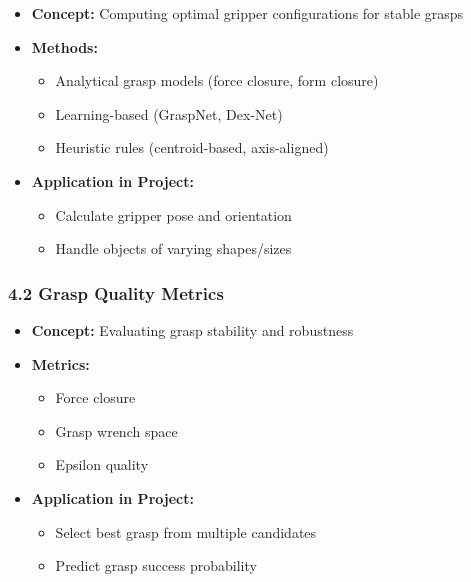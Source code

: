 \documentclass[
]{article}
\providecommand{\tightlist}{%
  \setlength{\itemsep}{0pt}\setlength{\parskip}{0pt}}
\begin{document}
\begin{itemize}
\tightlist
\item
  \textbf{Concept:} Computing optimal gripper configurations for stable
  grasps
\item
  \textbf{Methods:}

  \begin{itemize}
  \tightlist
  \item
    Analytical grasp models (force closure, form closure)
  \item
    Learning-based (GraspNet, Dex-Net)
  \item
    Heuristic rules (centroid-based, axis-aligned)
  \end{itemize}
\item
  \textbf{Application in Project:}

  \begin{itemize}
  \tightlist
  \item
    Calculate gripper pose and orientation
  \item
    Handle objects of varying shapes/sizes
  \end{itemize}
\end{itemize}

\hypertarget{grasp-quality-metrics}{%
\subsubsection{4.2 Grasp Quality Metrics}\label{grasp-quality-metrics}}

\begin{itemize}
\tightlist
\item
  \textbf{Concept:} Evaluating grasp stability and robustness
\item
  \textbf{Metrics:}

  \begin{itemize}
  \tightlist
  \item
    Force closure
  \item
    Grasp wrench space
  \item
    Epsilon quality
  \end{itemize}
\item
  \textbf{Application in Project:}

  \begin{itemize}
  \tightlist
  \item
    Select best grasp from multiple candidates
  \item
    Predict grasp success probability
  \end{itemize}
\end{itemize}
\end{document}
